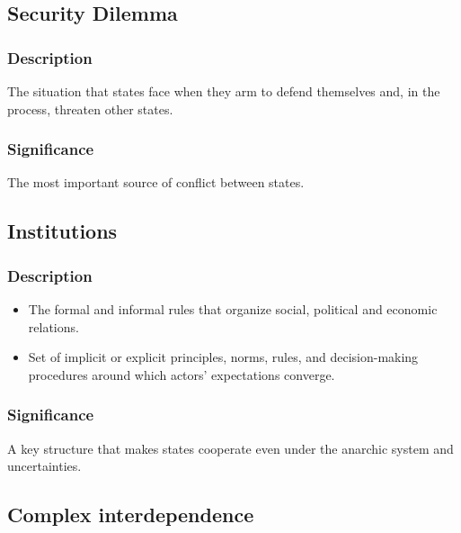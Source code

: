 \documentclass[
]{book}
\begin{document}
\hypertarget{security-dilemma}{%
\subsection{Security Dilemma}\label{security-dilemma}}

\hypertarget{description-6}{%
\subsubsection{Description}\label{description-6}}

The situation that states face when they arm to defend themselves and, in the process, threaten other states.

\hypertarget{significance-7}{%
\subsubsection{Significance}\label{significance-7}}

The most important source of conflict between states.

\hypertarget{institutions}{%
\subsection{Institutions}\label{institutions}}

\hypertarget{description-7}{%
\subsubsection{Description}\label{description-7}}

\begin{itemize}
\item
  The formal and informal rules that organize social, political and economic relations.
\item
  Set of implicit or explicit principles, norms, rules, and decision-making procedures around which actors' expectations converge.
\end{itemize}

\hypertarget{significance-8}{%
\subsubsection{Significance}\label{significance-8}}

A key structure that makes states cooperate even under the anarchic system and uncertainties.

\hypertarget{complex-interdependence}{%
\subsection{Complex interdependence}\label{complex-interdependence}}
\end{document}
